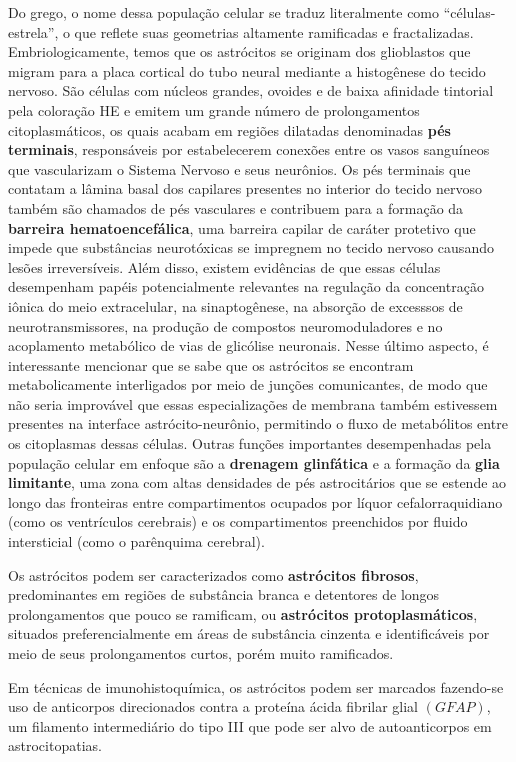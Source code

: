 \documentclass[
]{book}
\begin{document}
Do grego, o nome dessa população celular se traduz literalmente como ``células-estrela'', o que reflete suas geometrias altamente ramificadas e fractalizadas. Embriologicamente, temos que os astrócitos se originam dos glioblastos que migram para a placa cortical do tubo neural mediante a histogênese do tecido nervoso. São células com núcleos grandes, ovoides e de baixa afinidade tintorial pela coloração HE e emitem um grande número de prolongamentos citoplasmáticos, os quais acabam em regiões dilatadas denominadas \textbf{pés terminais}, responsáveis por estabelecerem conexões entre os vasos sanguíneos que vascularizam o Sistema Nervoso e seus neurônios. Os pés terminais que contatam a lâmina basal dos capilares presentes no interior do tecido nervoso também são chamados de pés vasculares e contribuem para a formação da \textbf{barreira hematoencefálica}, uma barreira capilar de caráter protetivo que impede que substâncias neurotóxicas se impregnem no tecido nervoso causando lesões irreversíveis. Além disso, existem evidências de que essas células desempenham papéis potencialmente relevantes na regulação da concentração iônica do meio extracelular, na sinaptogênese, na absorção de excesssos de neurotransmissores, na produção de compostos neuromoduladores e no acoplamento metabólico de vias de glicólise neuronais. Nesse último aspecto, é interessante mencionar que se sabe que os astrócitos se encontram metabolicamente interligados por meio de junções comunicantes, de modo que não seria improvável que essas especializações de membrana também estivessem presentes na interface astrócito-neurônio, permitindo o fluxo de metabólitos entre os citoplasmas dessas células. Outras funções importantes desempenhadas pela população celular em enfoque são a \textbf{drenagem glinfática} e a formação da \textbf{glia limitante}, uma zona com altas densidades de pés astrocitários que se estende ao longo das fronteiras entre compartimentos ocupados por líquor cefalorraquidiano (como os ventrículos cerebrais) e os compartimentos preenchidos por fluido intersticial (como o parênquima cerebral).

Os astrócitos podem ser caracterizados como \textbf{astrócitos fibrosos}, predominantes em regiões de substância branca e detentores de longos prolongamentos que pouco se ramificam, ou \textbf{astrócitos protoplasmáticos}, situados preferencialmente em áreas de substância cinzenta e identificáveis por meio de seus prolongamentos curtos, porém muito ramificados.

Em técnicas de imunohistoquímica, os astrócitos podem ser marcados fazendo-se uso de anticorpos direcionados contra a proteína ácida fibrilar glial \((GFAP)\), um filamento intermediário do tipo III que pode ser alvo de autoanticorpos em astrocitopatias.
\end{document}
